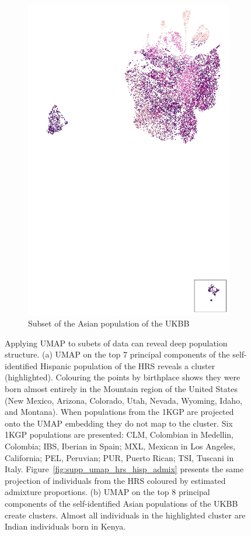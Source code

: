 \documentclass[12pt]{pnas-new}
\begin{document}
\begin{figure}
\begin{subfigure}{0.5\columnwidth}
    \includegraphics[width=\columnwidth]{images/Asthma_FullAsian_PC_QC_new_UMAP_PC8_NC2_NN15_MD05_20193117303txt_eth_for_ms_lw2.jpeg}
    \caption{Subset of the Asian population of the UKBB}
        \label{fig:umap_ukbb_indian}
    \end{subfigure}
    \caption{Applying UMAP to subets of data can reveal deep population structure. (a) UMAP on the top $7$ principal components of the self-identified Hispanic population of the HRS reveals a cluster (highlighted). Colouring the points by birthplace shows they were born almost entirely in the Mountain region of the United States (New Mexico, Arizona, Colorado, Utah, Nevada, Wyoming, Idaho, and Montana). When populations from the 1KGP are projected onto the UMAP embedding they do not map to the cluster. Six 1KGP populations are presented:
    CLM, Colombian in Medellin, Colombia;
    IBS, Iberian in Spain;
    MXL, Mexican in Los Angeles, California;
    PEL, Peruvian;
    PUR, Puerto Rican;
    TSI, Tuscani in Italy. Figure~\ref{fig:supp_umap_hrs_hisp_admix} presents the same projection of individuals from the HRS coloured by estimated admixture proportions. (b) UMAP on the top $8$ principal components of the self-identified Asian populations of the UKBB create clusters. Almost all individuals in the highlighted cluster are Indian individuals born in Kenya.}
    \label{fig:subpops}
\end{figure}
\end{document}
